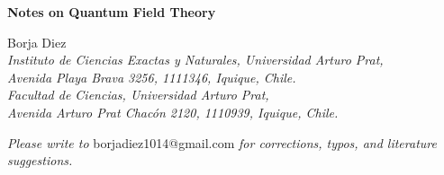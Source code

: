 \documentclass[11pt,letterpaper]{article}
\def\author{Borja Diez}
\def\title{Notes on Quantum Field Theory}
\theoremstyle{definition}
\begin{document}
{\centering
 \vspace*{1cm}
\textbf{\LARGE{\title{}}}
\vspace{0.5cm}
\begin{center}
\author{}\\
\vspace{0.5cm}
\textit{Instituto de Ciencias Exactas y Naturales, Universidad Arturo Prat,\\
Avenida Playa Brava 3256, 1111346, Iquique, Chile.\\
Facultad de Ciencias, Universidad Arturo Prat,\\
Avenida Arturo Prat Chac\'on 2120, 1110939, Iquique, Chile.}
\end{center}
\vspace{1cm}
\begin{abstract}
\vspace{0.5cm}
These notes are based on \cite{Schwartz:2014sze} and are for personal study purposes only.
\end{abstract}}

\vspace{5cm}

\begin{center}
\textit{Please write to} borjadiez1014@gmail.com \textit{for corrections, typos, and literature suggestions.}
\end{center}


\thispagestyle{empty}

\newpage
\tableofcontents
\thispagestyle{empty}
\newpage
\clearpage
{} 



%











\newpage


\end{document}
